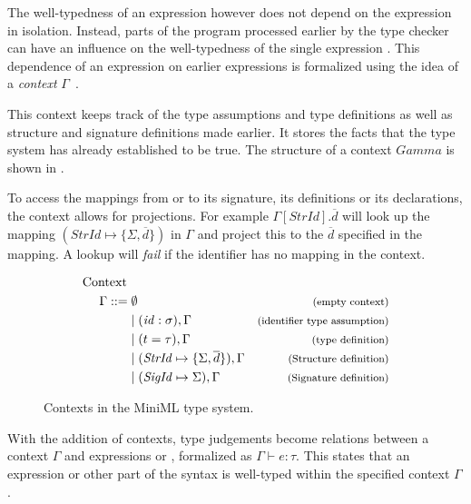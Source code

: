 The well-typedness of an expression  however does not depend on the expression  in isolation.
Instead, parts of the program processed earlier by the type checker can have an influence on the well-typedness of the single expression .
This dependence of an expression  on earlier expressions is formalized using the idea of a \emph{context} $\Gamma$~\cite{Pierce}. 

This context keeps track of the type assumptions and type definitions as well as structure and signature definitions made earlier.
It stores the facts that the type system has already established to be true.
The structure of a context $Gamma$ is shown in .

To access the mappings from  or  to its signature, its definitions or its declarations, the context allows for projections. For example $\Gamma[\mathit{StrId}].\overline{d}$ will look up the mapping $(\mathit{StrId} \mapsto \lbrace \Sigma,\overline{d}\rbrace)$ in $\Gamma$ and project this to the $\overline{d}$ specified in the mapping. A lookup will \emph{fail} if the identifier has no mapping in the context.

\begin{figure}[!htb]
\begin{align*}
\begin{aligned}
\text{Context }\\
\Gamma ::=\; &\emptyset     & \footnotesize\text{(empty context)}\\
&| \; (\mathit{id}:\sigma),\Gamma          & \footnotesize\text{(identifier type assumption)}\\
&| \; (t = \tau), \Gamma                   & \footnotesize\text{(type definition)}\\
&| \; (\mathit{StrId} \mapsto \lbrace \Sigma,\overline{d}\rbrace), \Gamma 
                                           & \footnotesize\text{(Structure definition)}\\
&| \; (\mathit{SigId} \mapsto \Sigma), \Gamma
                                           & \footnotesize\text{(Signature definition)}
\end{aligned}
\end{align*}
\caption[Contexts]{Contexts in the MiniML type system.}
\label{fig:MiniMLContexts}
\end{figure}

With the addition of contexts, type judgements become relations between a context $\Gamma$ and expressions  or , formalized as $\Gamma \vdash e:\tau$.
This states that an expression or other part of the syntax is well-typed within the specified context $\Gamma$.

